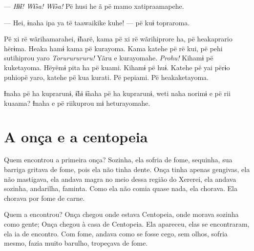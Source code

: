 --- \textit{Hɨ̃ɨ! Wɨ̃sa! Wɨ̃sa! }Pë husi he ã pë mamo xatipraamapehe. 

--- Hei, ɨnaha ipa ya të taawaikike kuhe! --- pë kuɨ topraroma. 


Pë xi rë wãrihamarahei, ɨ̃harë, kama pë xi rë wãrihiprore ha, pë
heakaprario hërɨma. Heaka hamɨ kama pë kurayoma. Kama katehe pë rë kui,
pë pehi sutihiprou yaro \textit{Torururururu!} Yãru e kurayomahe. \textit{Prohu!} Kihamɨ
pë kuketayoma. Hëyëmɨ pita ha pë kuami. Kihamɨ pë huɨ. Katehe pë yai
përɨo puhiopë yaro, katehe pë kua kurati. Pë pepiami. Pë heakaketayoma. 

Ɨnaha pë ha kuprarunɨ, ɨ̃hɨ ɨ̃naha pë ha kuprarunɨ, weti naha norimɨ e pë
rii kuaama? Ɨnaha e pë riikuprou mɨ heturayomahe. 

 
\chapter{A onça e a centopeia}
 
  

Quem encontrou a primeira onça? Sozinha, ela sofria de fome, sequinha,
sua barriga gritava de fome, pois ela não tinha dente. Onça tinha apenas
gengivas, ela não mastigava, ela andava magra no meio dessa região do
Xererei, ela andava sozinha, andarilha, faminta. Como ela não comia quase
nada, ela chorava. Ela chorava por fome de carne. 

Quem a encontrou? Onça chegou onde estava Centopeia, onde morava
sozinha como gente; Onça chegou à casa de Centopeia. Ela apareceu, elas
se encontraram, ela ia de encontro. Com fome, andava como se fosse cego,
sem olhos, sofria mesmo, fazia muito barulho, tropeçava de fome. 

